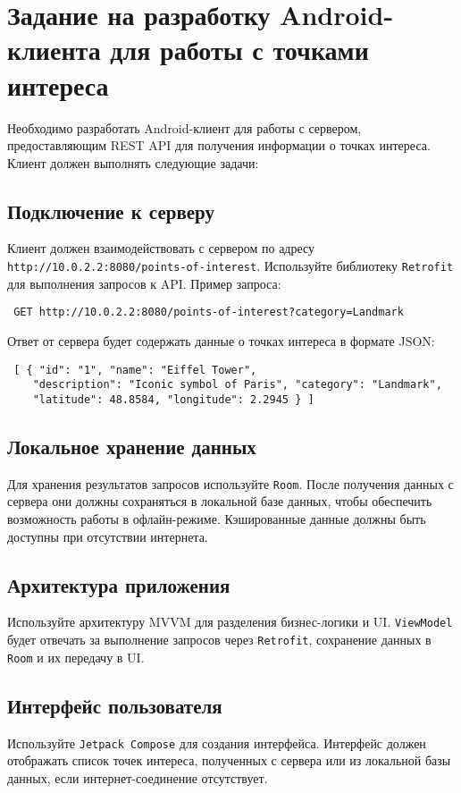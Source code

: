 \section{Задание на разработку Android-клиента для работы с точками интереса}

Необходимо разработать Android-клиент для работы с сервером, предоставляющим REST API для получения информации о точках интереса. Клиент должен выполнять следующие задачи:

\subsection{Подключение к серверу} Клиент должен взаимодействовать с сервером по адресу \texttt{http://10.0.2.2:8080/points-of-interest}. Используйте библиотеку \texttt{Retrofit} для выполнения запросов к API. Пример запроса:

\begin{verbatim} GET http://10.0.2.2:8080/points-of-interest?category=Landmark \end{verbatim}

Ответ от сервера будет содержать данные о точках интереса в формате JSON:

\begin{verbatim} [ { "id": "1", "name": "Eiffel Tower", 
    "description": "Iconic symbol of Paris", "category": "Landmark", 
    "latitude": 48.8584, "longitude": 2.2945 } ] \end{verbatim}

\subsection{Локальное хранение данных} Для хранения результатов запросов используйте \texttt{Room}. После получения данных с сервера они должны сохраняться в локальной базе данных, чтобы обеспечить возможность работы в офлайн-режиме. Кэшированные данные должны быть доступны при отсутствии интернета.

\subsection{Архитектура приложения} Используйте архитектуру MVVM для разделения бизнес-логики и UI. \texttt{ViewModel} будет отвечать за выполнение запросов через \texttt{Retrofit}, сохранение данных в \texttt{Room} и их передачу в UI.

\subsection{Интерфейс пользователя} Используйте \texttt{Jetpack Compose} для создания интерфейса. Интерфейс должен отображать список точек интереса, полученных с сервера или из локальной базы данных, если интернет-соединение отсутствует.

